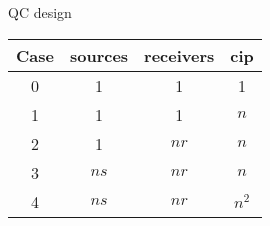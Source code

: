 \begin{frame}{QC design}

\begin{center}
    \begin{tabular}{ | c | c | c | c |}
    \hline
    Case   & sources & receivers & cip   \\ \hline
       0   &    1    &      1    &  1    \\ \hline
       1   &    1    &      1    & $n$   \\ \hline
       2   &    1    &    $nr$   & $n$   \\ \hline
       3   &   $ns$  &    $nr$   & $n$   \\ \hline
       4   &   $ns$  &    $nr$   & $n^2$ \\ 
    \hline
    \end{tabular}
\end{center}
\end{frame}

